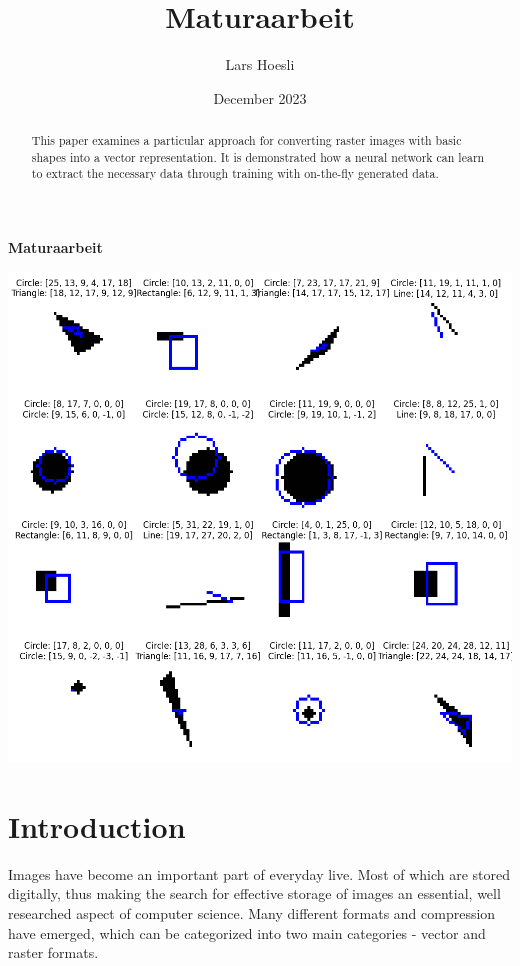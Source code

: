 \documentclass[12pt, a4paper, titlepage]{report}
\title{Maturaarbeit}
\author{Lars Hoesli}
\date{December 2023}
\begin{document}
\begin{titlepage}
    \centering

    \Huge{\textbf{Maturaarbeit}}
    \par
    \LARGE{\insertauthor}

    \large{\insertdate}
    \vspace{2cm}

    \includegraphics[width=1.0\textwidth]{../rc/images/all_shapes_approx_visual1.png}
    \vfill
    \begin{abstract}
		 This paper examines a particular approach for converting raster images with basic shapes into a vector representation.
		 It is demonstrated how a neural network can learn to extract the necessary data through training with on-the-fly generated data.
    \end{abstract}
\end{titlepage}


\chapter{Introduction}

Images have become an important part of everyday live. Most of which are stored digitally, thus making the search for effective storage of images an essential, well researched aspect of computer science.
Many different formats and compression have emerged, which can be categorized into two main categories - vector and raster formats.
\end{document}
